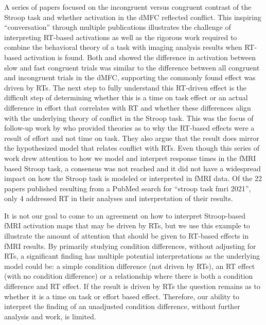 \documentclass[titlepage,12pt] {article}
\begin{document}
A series of papers focused on the incongruent versus congruent contrast of the Stroop task and whether activation in the dMFC reflected conflict.  This inspiring ``conversation'' through multiple publications illustrates the challenge of interpreting RT-based activations as well as the rigorous work required to combine the behavioral theory of a task with imaging analysis results when RT-based activation is found.  Both \citet{grinband_dorsal_2011} and \citet{carp_conditional_2010} showed the difference in activation between slow and fast congruent trials was similar to the difference between all congruent and incongruent trials in the dMFC, supporting the commonly found effect was driven by RTs.   The next step to fully understand this RT-driven effect is the difficult step of determining whether this is a time on task effect or an actual difference in effort that correlates with RT and whether these differences align with the underlying theory of conflict in the Stroop task.  This was the focus of follow-up work by \citet{yeung_errors_2011} who provided theories as to why the RT-based effects were a result of effort and not time on task. They also argue that the result does mirror the hypothesized model that relates conflict with RTs.   Even though this series of work drew attention to how we model and interpret response times in the fMRI based Stroop task, a consensus was not reached \citep{brown_medial_2011, grinbandConflictErrorLikelihood2011,nachevBlindExecutive2011} and it did not have a widespread impact on how the Stroop task is modeled or interpreted in fMRI data. Of the 22 papers published resulting from a PubMed search for ``stroop task fmri 2021'', only 4 addressed RT in their analyses and interpretation of their results.  


It is not our goal to come to an agreement on how to interpret Stroop-based fMRI activation maps that may be driven by RTs, but we use this example to illustrate the amount of attention that should be given to RT-based effects in fMRI results. By primarily studying condition differences, without adjusting for RTs, a significant finding has multiple potential interpretations as the underlying model could be: a simple condition difference (not driven by RTs), an RT effect (with no condition difference) or a relationship where there is both a condition difference and RT effect. 
 If the result is driven by RTs the question remains as to whether it is a time on task or effort based effect. Therefore, our ability to interpret the finding of an unadjusted condition difference, without further analysis and work, is limited.
\end{document}
